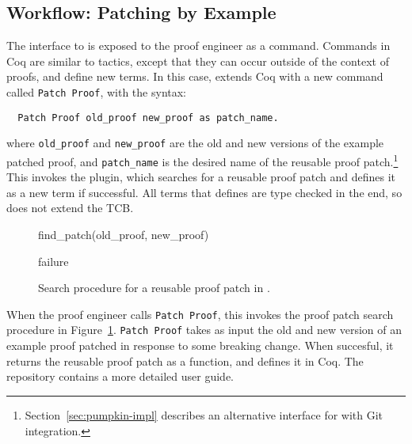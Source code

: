 \subsection{Workflow: Patching by Example}
\label{sec:pumpkin-workflow}

The interface to \sysname is exposed to the proof engineer as a command.
Commands in Coq are similar to tactics, except that they can occur outside of the context of proofs, and define new terms.
In this case, \sysname extends Coq with a new command called \lstinline{Patch Proof}, with the syntax:

\begin{lstlisting}
  Patch Proof old_proof new_proof as patch_name. 
\end{lstlisting}
where \lstinline{old_proof} and \lstinline{new_proof} are the old and new versions of the example patched proof,
and \lstinline{patch_name} is the desired name of the reusable proof patch.\footnote{Section~\ref{sec:pumpkin-impl} describes an alternative interface for \sysname with Git integration.}
This invokes the \sysname plugin, which searches for a reusable proof patch
and defines it as a new term if successful.
All terms that \sysname defines are type checked in the end, so \sysname does not extend the TCB. %

\begin{figure}
\begin{algorithmic}
\renewcommand{\thealgorithm}{}
\footnotesize
\caption{\footnotesize{find\_patch(old\_proof, new\_proof)}}
    \STATE {}
    \STATE {}
      \STATE {}
    \ENDIF
    \RETURN failure
\end{algorithmic}
\caption{Search procedure for a reusable proof patch in \sysname.}
\label{alg:patching}	
\end{figure}

When the proof engineer calls \lstinline{Patch Proof}, this invokes the proof patch search procedure in Figure~\ref{alg:patching}.
\lstinline{Patch Proof} takes as input the old and new version of an example proof patched in response to some breaking change.
When succesful, it returns the reusable proof patch as a function, and defines it in Coq.
The \sysname repository contains a more detailed user guide.

